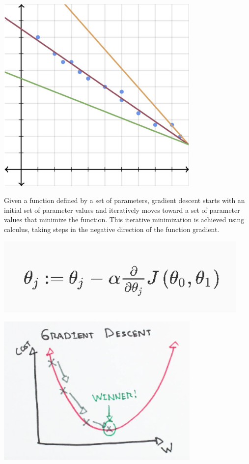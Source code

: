 \documentclass{42-en}
\begin{document}
\centerline{\includegraphics[width=100mm]{images/grad_pretty.png}}

Given a function defined by a set of parameters, gradient descent starts with an initial set of parameter values and iteratively moves toward a set of parameter values that minimize the function. This iterative minimization is achieved using calculus, taking steps in the negative direction of the function gradient.\\

\centerline{\includegraphics[width=125mm]{images/gradientDescent.png}}

\centerline{\includegraphics[width=100mm]{images/gradient_descent_demystified.png}}
\end{document}

